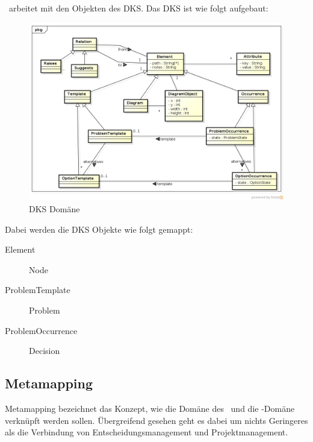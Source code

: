 			\eeppi\ arbeitet mit den Objekten des DKS. Das DKS ist wie folgt aufgebaut:
			\begin{figure}[H]
				\includegraphics[width=\linewidth]{architecture/media/img/dksDomain.png}
				\centering
				\caption[DKS Domäne\newline 
				]{DKS Domäne}
				\label{fig:dksDomain}
			\end{figure}
			
			Dabei werden die DKS Objekte wie folgt gemappt:
			\begin{description}
				\item[Element] Node
				\item[ProblemTemplate] Problem
				\item[ProblemOccurrence] Decision			
			\end{description}
			
			
		\subsection{Metamapping}
			Metamapping bezeichnet das Konzept, 
			wie die Domäne des \dks\ und die \eeppi -Domäne verknüpft werden sollen.
			Übergreifend gesehen geht es dabei um nichts Geringeres als die Verbindung von Entscheidungsmanagement und Projektmanagement.			
		
